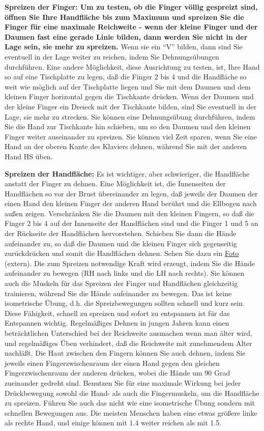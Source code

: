 \textbf{Spreizen der Finger: Um zu testen, ob die Finger völlig gespreizt sind, öffnen Sie Ihre Handfläche bis zum Maximum und spreizen Sie die Finger für eine maximale Reichweite - wenn der kleine Finger und der Daumen fast eine gerade Linie bilden, dann werden Sie nicht in der Lage sein, sie mehr zu spreizen.}
Wenn sie ein \enquote{V} bilden, dann sind Sie eventuell in der Lage weiter zu reichen, indem Sie Dehnungsübungen durchführen.
Eine andere Möglichkeit, diese Ausrichtung zu testen, ist, Ihre Hand so auf eine Tischplatte zu legen, daß die Finger 2 bis 4 und die Handfläche so weit wie möglich auf der Tischplatte liegen und Sie mit dem Daumen und dem kleinen Finger horizontal gegen die Tischkante drücken.
Wenn der Daumen und der kleine Finger ein Dreieck mit der Tischkante bilden, sind Sie eventuell in der Lage, sie mehr zu strecken.
Sie können eine Dehnungsübung durchführen, indem Sie die Hand zur Tischkante hin schieben, um so den Daumen und den kleinen Finger weiter auseinander zu spreizen.
Sie können viel Zeit sparen, wenn Sie eine Hand an der oberen Kante des Klaviers dehnen, während Sie mit der anderen Hand HS üben.

\textbf{Spreizen der Handfläche:}
Es ist wichtiger, aber schwieriger, die Handfläche anstatt der Finger zu dehnen.
Eine Möglichkeit ist, die Innenseiten der Handflächen so vor der Brust übereinander zu legen, daß jeweils der Daumen der einen Hand den kleinen Finger der anderen Hand berührt und die Ellbogen nach außen zeigen.
Verschränken Sie die Daumen mit den kleinen Fingern, so daß die Finger 2 bis 4 auf der Innenseite der Handflächen sind und die Finger 1 und 5 an der Rückseite der Handflächen hervorstehen.
Schieben Sie dann die Hände aufeinander zu, so daß die Daumen und die kleinen Finger sich gegenseitig zurückdrücken und somit die Handflächen dehnen.
Sehen Sie dazu ein \hyperref[http://www.pianopractice.org/palmstretch.jpg]{Foto} (extern).
Die zum Spreizen notwendige Kraft wird erzeugt, indem Sie die Hände aufeinander zu bewegen (RH nach links und die LH nach rechts).
Sie können auch die Muskeln für das Spreizen der Finger und Handflächen gleichzeitig trainieren, während Sie die Hände aufeinander zu bewegen.
Das ist keine isometrische Übung, d.h. die Spreizbewegungen sollten schnell und kurz sein.
Diese Fähigkeit, schnell zu spreizen und sofort zu entspannen ist für das Entspannen wichtig.
Regelmäßiges Dehnen in jungen Jahren kann einen beträchtlichen Unterschied bei der Reichweite ausmachen wenn man älter wird, und regelmäßiges Üben verhindert, daß die Reichweite mit zunehmendem Alter nachläßt.
Die Haut zwischen den Fingern können Sie auch dehnen, indem Sie jeweils einen Fingerzwischenraum der einen Hand gegen den gleichen Fingerzwischenraum der anderen drücken, wobei die Hände um 90 Grad zueinander gedreht sind.
Benutzen Sie für eine maximale Wirkung bei jeder Drückbewegung sowohl die Hand- als auch die Fingermuskeln, um die Handfläche zu spreizen.
Führen Sie auch das nicht wie eine isometrische Übung sondern mit schnellen Bewegungen aus.
Die meisten Menschen haben eine etwas größere linke als rechte Hand, und einige können mit 1.4 weiter reichen als mit 1.5.

